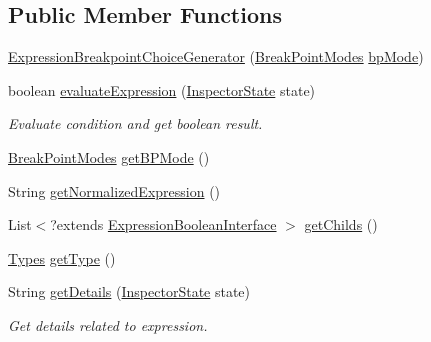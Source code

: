 \subsection*{Public Member Functions}
\begin{DoxyCompactItemize}
\item 
\hyperlink{classgov_1_1nasa_1_1jpf_1_1inspector_1_1server_1_1expression_1_1expressions_1_1_expression_breakpoint_choice_generator_a69d3df6db29cdd49184f1849ec3968c8}{Expression\+Breakpoint\+Choice\+Generator} (\hyperlink{enumgov_1_1nasa_1_1jpf_1_1inspector_1_1server_1_1breakpoints_1_1_break_point_modes}{Break\+Point\+Modes} \hyperlink{classgov_1_1nasa_1_1jpf_1_1inspector_1_1server_1_1expression_1_1expressions_1_1_expression_breakpoint_choice_generator_a54c8ee994440489544d16b934c8c4854}{bp\+Mode})
\item 
boolean \hyperlink{classgov_1_1nasa_1_1jpf_1_1inspector_1_1server_1_1expression_1_1expressions_1_1_expression_breakpoint_choice_generator_aec1ca74841249340ec4ace864c69b39f}{evaluate\+Expression} (\hyperlink{interfacegov_1_1nasa_1_1jpf_1_1inspector_1_1server_1_1expression_1_1_inspector_state}{Inspector\+State} state)
\begin{DoxyCompactList}\small\item\em Evaluate condition and get boolean result. \end{DoxyCompactList}\item 
\hyperlink{enumgov_1_1nasa_1_1jpf_1_1inspector_1_1server_1_1breakpoints_1_1_break_point_modes}{Break\+Point\+Modes} \hyperlink{classgov_1_1nasa_1_1jpf_1_1inspector_1_1server_1_1expression_1_1expressions_1_1_expression_breakpoint_choice_generator_a6f5e7b1b6f270c86126c05bf98949507}{get\+B\+P\+Mode} ()
\item 
String \hyperlink{classgov_1_1nasa_1_1jpf_1_1inspector_1_1server_1_1expression_1_1expressions_1_1_expression_breakpoint_choice_generator_ab67433e7da858bcecedb829ced021e5c}{get\+Normalized\+Expression} ()
\item 
List$<$?extends \hyperlink{interfacegov_1_1nasa_1_1jpf_1_1inspector_1_1server_1_1expression_1_1_expression_boolean_interface}{Expression\+Boolean\+Interface} $>$ \hyperlink{classgov_1_1nasa_1_1jpf_1_1inspector_1_1server_1_1expression_1_1_expression_boolean_leaf_aa99bf3cf13bd8cc1d6c33208bc83b185}{get\+Childs} ()
\item 
\hyperlink{enumgov_1_1nasa_1_1jpf_1_1inspector_1_1server_1_1expression_1_1_types}{Types} \hyperlink{classgov_1_1nasa_1_1jpf_1_1inspector_1_1server_1_1expression_1_1_expression_boolean_aed010ff8683eb1e8621e226703133457}{get\+Type} ()
\item 
String \hyperlink{classgov_1_1nasa_1_1jpf_1_1inspector_1_1server_1_1expression_1_1_expression_boolean_a43423e204404f24bf7862de938598eb7}{get\+Details} (\hyperlink{interfacegov_1_1nasa_1_1jpf_1_1inspector_1_1server_1_1expression_1_1_inspector_state}{Inspector\+State} state)
\begin{DoxyCompactList}\small\item\em Get details related to expression. \end{DoxyCompactList}\end{DoxyCompactItemize}
